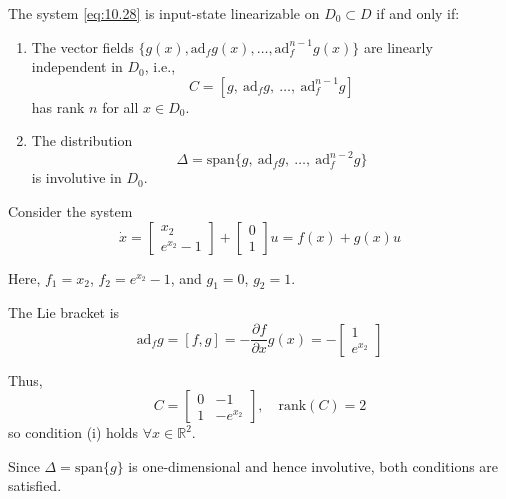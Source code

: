 \begin{theorem}
The system \eqref{eq:10.28} is input-state linearizable on $D_0 \subset D$ if and only if:
\begin{enumerate}
\item The vector fields $\{ g(x), \text{ad}_f g(x), \dots, \text{ad}_f^{n-1} g(x) \}$ are linearly independent in $D_0$, i.e.,
\begin{equation}
C = [g,~ \text{ad}_f g,~ \dots,~ \text{ad}_f^{n-1} g]
\end{equation}
has rank $n$ for all $x \in D_0$.
\item The distribution 
\begin{equation}
\Delta = \text{span}\{ g,~ \text{ad}_f g,~ \dots,~ \text{ad}_f^{n-2} g \}
\end{equation}
is involutive in $D_0$.
\end{enumerate}
\end{theorem}


\begin{example}[Example]
Consider the system
\begin{equation}
\dot{x} =
\begin{bmatrix}
x_2 \\ e^{x_2} - 1
\end{bmatrix}
+
\begin{bmatrix}
0 \\ 1
\end{bmatrix}u
= f(x) + g(x)u
\end{equation}

Here,
$f_1 = x_2$, $f_2 = e^{x_2} - 1$, and $g_1 = 0$, $g_2 = 1$.

The Lie bracket is
\begin{equation}
\text{ad}_f g = [f, g] = -\frac{\partial f}{\partial x} g(x)
= -
\begin{bmatrix}
1 \\ e^{x_2}
\end{bmatrix}
\end{equation}

Thus,
\[
C =
\begin{bmatrix}
0 & -1 \\
1 & -e^{x_2}
\end{bmatrix}, \quad
\text{rank}(C) = 2
\]
so condition (i) holds $\forall x \in \mathbb{R}^2$.

Since $\Delta = \text{span}\{g\}$ is one-dimensional and hence involutive, both conditions are satisfied.
\end{example}


